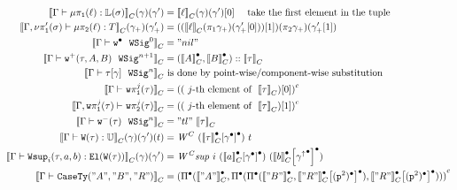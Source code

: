 

\begin{align*}
  \denotesC{\goodTerm{\Gm}{\lkgproj{1}{\lkg}}{\TyLkg{\lsig}}}(\gm)(\gm') &= \denotesC{\ell}(\gm)(\gm')[0] \quad \text{ take the first element in the tuple} \\
  \denotesC{\goodTerm{\Gm, \lsigprojT{\lsig}}{\lkgproj{2}{\lkg}}{T}}(\gm_+)(\gm_+') &= ((\denotesC{\ell}(\pi_1{\gm_+})(\gm_+'[0]))[1])(\pi_2{\gm_+})(\gm_+'[1]) \\
  \denotesC{\goodWSig{\Gm}{\WSigEmp}{0}} &= "nil" \\
  \denotesC{\goodWSig{\Gm}{\WSigAdd{\wsig}{A}{B}}{n+1}} &= (\denotesCC{A} , \denotesCC{B}) :: \denotesC{\wsig}\\
  \denotesC{\goodWSig{\Gm}{\sub{\wsig}{\gm}}{n}} & \text{ is done by point-wise/component-wise substitution} \\
  \denotesC{\goodType{\Gm}{\wsigproj{j}{1}{\wsig}}{}} &= \Gmodel{(\text{ $j$-th element of }~\denotesC{\wsig})[0]}\\
  \denotesC{\goodType{\Gm, \wsigproj{j}{1}{\wsig}}{\wsigproj{j}{2}{\wsig}}{}} &= \Gmodel{(\text{ $j$-th element of }~\denotesC{\wsig})[1]}\\
  \denotesC{\goodWSig{\Gm}{\WSigSub{\wsig}}{n}} &= "tl"~\denotesC{\wsig}\\
  \denotesC{\goodTerm{\Gm}{\wcode{\wsig}}{\cU}}(\gm)(\gm')(t) &= \CWmodel~(\Gsub{\denotesCC{\wsig}}{\Glued{\gm}})~t \\
  \denotesC{\goodTerm{\Gm}{\Wsup{i}{\wsig}{a}{b}}{\El{\wcode{\wsig}}}}(\gm)(\gm') &= \CWsup~i~(\Gsub{\denotesCC{a}}{\Glued{\gm}})~(\Gsub{\denotesCC{b}}{{\Glued{\gm^\uparrow}}}) \\
  \denotesC{\goodType{\Gm}{\CaseSig{"A"}{"B"}{"R"}}{}} &= 
  \Gmodel{\GluedPi{\denotesCC{"A"}}{\GluedPi {\GluedPi{\denotesCC{"B"}}{\Gsub{\denotesCC{"R"}}{\GSubstWeak{2}}}} {\Gsub{\denotesCC{"R"}}{\GSubstWeak{2}}}}} \\
\end{align*}
